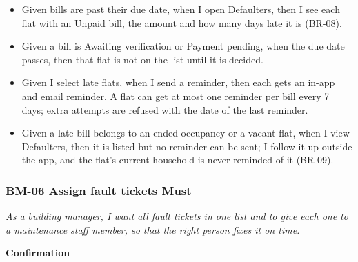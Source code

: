 \documentclass[11pt,a4paper]{report}
\begin{document}
\begin{itemize}
  \item Given bills are past their due date, when I open Defaulters, then I see each flat with an Unpaid bill, the amount and how many days late it is (BR-08).
  \item Given a bill is Awaiting verification or Payment pending, when the due date passes, then that flat is not on the list until it is decided.
  \item Given I select late flats, when I send a reminder, then each gets an in-app and email reminder. A flat can get at most one reminder per bill every 7 days; extra attempts are refused with the date of the last reminder.
  \item Given a late bill belongs to an ended occupancy or a vacant flat, when I view Defaulters, then it is listed but no reminder can be sent; I follow it up outside the app, and the flat's current household is never reminded of it (BR-09).
\end{itemize}

\subsubsection*{BM-06 \textperiodcentered{} Assign fault tickets \textperiodcentered{} Must}

\emph{As a building manager, I want all fault tickets in one list and to give each one to a maintenance staff member, so that the right person fixes it on time.}

\medskip\noindent\textbf{Confirmation}\par
\end{document}
